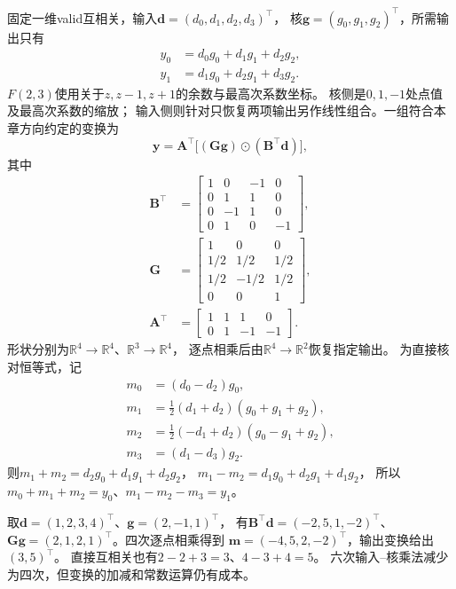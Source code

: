 \begin{example}
  \label{ex:signal-analysis-winograd-f23}
  固定一维valid互相关，输入$\bm d=(d_0,d_1,d_2,d_3)^\top$，
  核$\bm g=(g_0,g_1,g_2)^\top$，所需输出只有
  \begin{align*}
    y_0&=d_0g_0+d_1g_1+d_2g_2,\\
    y_1&=d_1g_0+d_2g_1+d_3g_2.
  \end{align*}
  $F(2,3)$使用关于$z,z-1,z+1$的余数与最高次系数坐标。
  核侧是$0,1,-1$处点值及最高次系数的缩放；
  输入侧则针对只恢复两项输出另作线性组合。一组符合本章方向约定的变换为
  \begin{equation}
    \bm y=\bm A^\top\bigl[(\bm G\bm g)\odot(\bm B^\top\bm d)\bigr],
    \label{eq:signal-analysis-winograd-f23}
  \end{equation}
  其中
  \begin{align*}
    \bm B^\top&=\begin{bmatrix}
      1&0&-1&0\\0&1&1&0\\0&-1&1&0\\0&1&0&-1
    \end{bmatrix},\\
    \bm G&=\begin{bmatrix}
      1&0&0\\1/2&1/2&1/2\\1/2&-1/2&1/2\\0&0&1
    \end{bmatrix},\\
    \bm A^\top&=\begin{bmatrix}1&1&1&0\\0&1&-1&-1\end{bmatrix}.
  \end{align*}
  形状分别为$\mathbb R^4\to\mathbb R^4$、$\mathbb R^3\to\mathbb R^4$，
  逐点相乘后由$\mathbb R^4\to\mathbb R^2$恢复指定输出。
  为直接核对恒等式，记
  \begin{align*}
    m_0&=(d_0-d_2)g_0,\\
    m_1&=\tfrac12(d_1+d_2)(g_0+g_1+g_2),\\
    m_2&=\tfrac12(-d_1+d_2)(g_0-g_1+g_2),\\
    m_3&=(d_1-d_3)g_2.
  \end{align*}
  则$m_1+m_2=d_2g_0+d_1g_1+d_2g_2$，
  $m_1-m_2=d_1g_0+d_2g_1+d_1g_2$，
  所以$m_0+m_1+m_2=y_0$、$m_1-m_2-m_3=y_1$。

  取$\bm d=(1,2,3,4)^\top$、$\bm g=(2,-1,1)^\top$，
  有$\bm B^\top\bm d=(-2,5,1,-2)^\top$、
  $\bm G\bm g=(2,1,2,1)^\top$。四次逐点相乘得到
  $\bm m=(-4,5,2,-2)^\top$，输出变换给出$(3,5)^\top$。
  直接互相关也有$2-2+3=3$、$4-3+4=5$。
  六次输入--核乘法减少为四次，但变换的加减和常数运算仍有成本。
\end{example}


